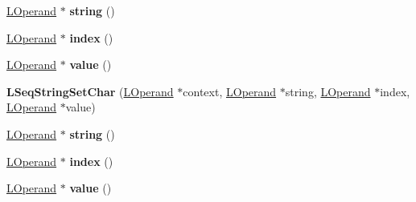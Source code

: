 \begin{DoxyCompactItemize}
\item 
\hyperlink{classv8_1_1internal_1_1_l_operand}{L\+Operand} $\ast$ {\bfseries string} ()\hypertarget{classv8_1_1internal_1_1_l_seq_string_set_char_a1fcee06e873470500f85a41f75bd0faa}{}\label{classv8_1_1internal_1_1_l_seq_string_set_char_a1fcee06e873470500f85a41f75bd0faa}

\item 
\hyperlink{classv8_1_1internal_1_1_l_operand}{L\+Operand} $\ast$ {\bfseries index} ()\hypertarget{classv8_1_1internal_1_1_l_seq_string_set_char_ab3e762192555a55b62a9b438635a1178}{}\label{classv8_1_1internal_1_1_l_seq_string_set_char_ab3e762192555a55b62a9b438635a1178}

\item 
\hyperlink{classv8_1_1internal_1_1_l_operand}{L\+Operand} $\ast$ {\bfseries value} ()\hypertarget{classv8_1_1internal_1_1_l_seq_string_set_char_aeb1a6ce9adf8943da9ec22afe2b5af72}{}\label{classv8_1_1internal_1_1_l_seq_string_set_char_aeb1a6ce9adf8943da9ec22afe2b5af72}

\item 
{\bfseries L\+Seq\+String\+Set\+Char} (\hyperlink{classv8_1_1internal_1_1_l_operand}{L\+Operand} $\ast$context, \hyperlink{classv8_1_1internal_1_1_l_operand}{L\+Operand} $\ast$string, \hyperlink{classv8_1_1internal_1_1_l_operand}{L\+Operand} $\ast$index, \hyperlink{classv8_1_1internal_1_1_l_operand}{L\+Operand} $\ast$value)\hypertarget{classv8_1_1internal_1_1_l_seq_string_set_char_a719cac196a8e6c740c4055635b87f496}{}\label{classv8_1_1internal_1_1_l_seq_string_set_char_a719cac196a8e6c740c4055635b87f496}

\item 
\hyperlink{classv8_1_1internal_1_1_l_operand}{L\+Operand} $\ast$ {\bfseries string} ()\hypertarget{classv8_1_1internal_1_1_l_seq_string_set_char_a1fcee06e873470500f85a41f75bd0faa}{}\label{classv8_1_1internal_1_1_l_seq_string_set_char_a1fcee06e873470500f85a41f75bd0faa}

\item 
\hyperlink{classv8_1_1internal_1_1_l_operand}{L\+Operand} $\ast$ {\bfseries index} ()\hypertarget{classv8_1_1internal_1_1_l_seq_string_set_char_ab3e762192555a55b62a9b438635a1178}{}\label{classv8_1_1internal_1_1_l_seq_string_set_char_ab3e762192555a55b62a9b438635a1178}

\item 
\hyperlink{classv8_1_1internal_1_1_l_operand}{L\+Operand} $\ast$ {\bfseries value} ()\hypertarget{classv8_1_1internal_1_1_l_seq_string_set_char_aeb1a6ce9adf8943da9ec22afe2b5af72}{}\label{classv8_1_1internal_1_1_l_seq_string_set_char_aeb1a6ce9adf8943da9ec22afe2b5af72}


\end{DoxyCompactItemize}
